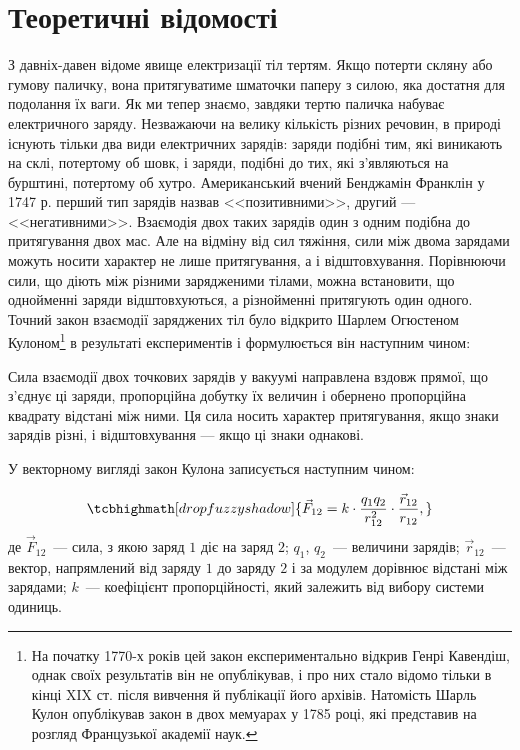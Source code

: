 
\section{Теоретичні відомості}

З давніх-давен відоме явище електризації тіл тертям. Якщо потерти скляну або гумову паличку, вона притягуватиме шматочки паперу з силою, яка достатня для подолання їх ваги. Як ми тепер знаємо, завдяки тертю паличка набуває електричного заряду. Незважаючи на велику кількість різних речовин, в природі існують тільки два види електричних зарядів: заряди подібні тим, які виникають на склі, потертому об шовк, і заряди, подібні до тих, які з'являються на бурштині, потертому об хутро. Американський вчений Бенджамін Франклін у 1747 р. перший тип зарядів назвав <<позитивними>>, другий --- <<негативними>>.  Взаємодія двох таких зарядів один з одним подібна до притягування двох мас. Але на відміну від сил тяжіння, сили між двома зарядами можуть носити характер не лише притягування, а і відштовхування. Порівнюючи сили, що діють між різними зарядженими тілами, можна встановити, що однойменні заряди відштовхуються, а різнойменні притягують один одного. Точний закон взаємодії заряджених тіл було відкрито Шарлем Огюстеном Кулоном\footnote{На початку 1770-х років цей закон експериментально відкрив Генрі Кавендіш, однак своїх результатів він не опублікував, і про них стало відомо тільки в кінці XIX ст. після вивчення й публікації його архівів. Натомість Шарль Кулон опублікував закон в двох мемуарах у 1785 році,  які представив на розгляд Французької академії наук.} в результаті експериментів і формулюється він наступним чином:

\begin{Definition}
Сила взаємодії двох точкових зарядів у вакуумі направлена вздовж прямої, що з'єднує ці заряди, пропорційна добутку їх величин і обернено пропорційна квадрату відстані між ними. Ця сила носить характер притягування, якщо знаки зарядів різні, і відштовхування --- якщо ці знаки однакові.
\end{Definition}

У векторному вигляді закон Кулона записується наступним чином:

\begin{equation}\label{key}
    \tcbhighmath[drop fuzzy shadow]{
    \vec{F}_{12}=k\cdot\frac{q_1  q_2}{r_{12}^2} \cdot \frac{\vec{r}_{12}}{r_{12}},
    }
\end{equation}
де $\vec{F}_{12}$ --- сила, з якою заряд $1$ діє на заряд $2$; $q_1$, $q_2$ --- величини зарядів; $\vec{r}_{12}$ --- вектор, напрямлений від заряду $1$ до заряду  $2$ і за модулем дорівнює відстані між зарядами; $k$ --- коефіцієнт пропорційності, який залежить від вибору системи одиниць.

